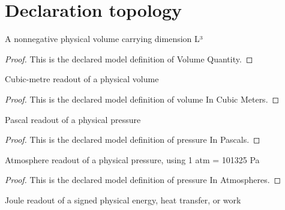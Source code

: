 \section{Declaration topology}
\begin{definition}
  \label{def:physics:phyx-mini-0480:phyxminiproblems-problemphyxmini0480-volumequantity}
  A nonnegative physical volume carrying dimension L³
\end{definition}
\begin{proof}
  This is the declared model definition of Volume Quantity.
\end{proof}
\begin{definition}
  \label{def:physics:phyx-mini-0480:phyxminiproblems-problemphyxmini0480-volumeincubicmeters}
  Cubic-metre readout of a physical volume
\end{definition}
\begin{proof}
  This is the declared model definition of volume In Cubic Meters.
\end{proof}
\begin{definition}
  \label{def:physics:phyx-mini-0480:phyxminiproblems-problemphyxmini0480-pressureinpascals}
  Pascal readout of a physical pressure
\end{definition}
\begin{proof}
  This is the declared model definition of pressure In Pascals.
\end{proof}
\begin{definition}
  \label{def:physics:phyx-mini-0480:phyxminiproblems-problemphyxmini0480-pressureinatmospheres}
  Atmosphere readout of a physical pressure, using 1 atm = 101325 Pa
\end{definition}
\begin{proof}
  This is the declared model definition of pressure In Atmospheres.
\end{proof}
\begin{definition}
  \label{def:physics:phyx-mini-0480:phyxminiproblems-problemphyxmini0480-energyinjoules}
  Joule readout of a signed physical energy, heat transfer, or work
\end{definition}
